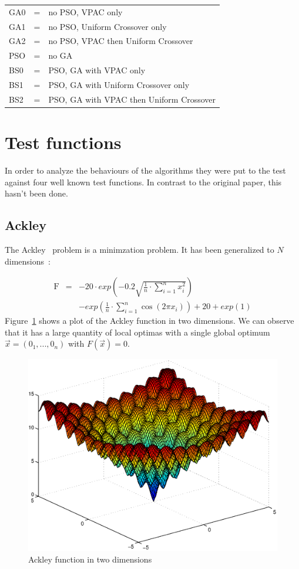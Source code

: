 \documentclass{acm_proc_article-sp}
\begin{document}
\begin{tabularx}{0.3\textwidth}{lll}
GA0 & = & no PSO, VPAC only\\
GA1 & = & no PSO, Uniform Crossover only\\
GA2 & = & no PSO, VPAC then Uniform Crossover\\
PSO & = & no GA\\
BS0 & = & PSO, GA with VPAC only\\
BS1 & = & PSO, GA with Uniform Crossover only\\
BS2 & = & PSO, GA with VPAC then Uniform Crossover\\
\end{tabularx}

\section{Test functions}\label{sec:test}
In order to analyze the behaviours of the algorithms they were put to the test against four well known test functions. In contrast to the original paper, this hasn't been done. 

\subsection{Ackley}
The Ackley~\cite{ACK87} problem is a minimzation problem. It has been generalized to $N$ dimensions~\cite{BAC96}:

\begin{eqnarray*}
    \mathop{F(\vec{x})}&=&-20\cdot exp(-0.2\sqrt{\frac{1}{n}\cdot\sum\limits_{i=1}^{n}x_{i}^{2}})\\
                    &&- exp(\frac{1}{n}\cdot\sum\limits_{i=1}^{n}\cos(2\pi
                    x_{i})) + 20 + exp(1)
\end{eqnarray*}
Figure~\ref{fig:ackley} shows a plot of the Ackley function in two dimensions.  We can observe that it has a large quantity of local optimas with a single global optimum $\vec{x} = (0_1, ..., 0_n)$ with $F(\vec{x}) = 0$.
\begin{figure}[ht]
\centering
\includegraphics[scale=0.4]{fig-ackley}
\caption{Ackley function in two dimensions}\label{fig:ackley}
\end{figure}
\end{document}
